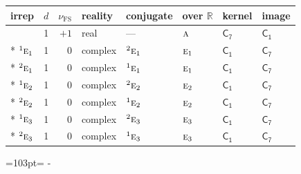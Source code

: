 \documentclass[10pt,a4paper]{article}
\newcommand{\needspace}[1]{\par\penalty-100\begingroup\dimen0=#1\relax\dimen2=\pagegoal
  \advance\dimen2-\pagetotal\ifdim\dimen0>\dimen2\relax\ifdim\dimen2>0pt\vfil\break\fi\fi
  \endgroup}
\numberwithin{equation}{section}
\newcommand{\grp}[1]{\mathsf{#1}}
\newcommand{\irr}[1]{\text{\normalfont\scshape #1}}
\newcommand{\conjpair}[1]{{}^{#1}}
\newcommand{\detbox}[1]{{\setlength{\fboxsep}{1pt}\fbox{#1}}}
\newcommand{\fsind}{\nu_{\mathrm{FS}}}
\begin{document}
{\small\renewcommand{\arraystretch}{1.25}\setlength{\tabcolsep}{4pt}\begin{longtable}{@{}lrrlllll@{}}\toprule
irrep & $d$ & $\fsind$ & reality & conjugate & over $\mathbb{R}$ & kernel & image\\\midrule\endhead
\bottomrule\endfoot\endlastfoot
\detbox{$\irr{a}$} & 1 & $+1$ & real & --- & $\irr{a}$ & \href{C7.pdf}{$\grp{C_{7}}$} & \href{C1.pdf}{$\grp{C_{1}}$}\\*
$\conjpair{1}\irr{e}_{1}$ & 1 & $0$ & complex & $\conjpair{2}\irr{e}_{1}$ & $\irr{e}_{1}$ & \href{C1.pdf}{$\grp{C_{1}}$} & \href{C7.pdf}{$\grp{C_{7}}$}\\*
$\conjpair{2}\irr{e}_{1}$ & 1 & $0$ & complex & $\conjpair{1}\irr{e}_{1}$ & $\irr{e}_{1}$ & \href{C1.pdf}{$\grp{C_{1}}$} & \href{C7.pdf}{$\grp{C_{7}}$}\\*
$\conjpair{1}\irr{e}_{2}$ & 1 & $0$ & complex & $\conjpair{2}\irr{e}_{2}$ & $\irr{e}_{2}$ & \href{C1.pdf}{$\grp{C_{1}}$} & \href{C7.pdf}{$\grp{C_{7}}$}\\*
$\conjpair{2}\irr{e}_{2}$ & 1 & $0$ & complex & $\conjpair{1}\irr{e}_{2}$ & $\irr{e}_{2}$ & \href{C1.pdf}{$\grp{C_{1}}$} & \href{C7.pdf}{$\grp{C_{7}}$}\\*
$\conjpair{1}\irr{e}_{3}$ & 1 & $0$ & complex & $\conjpair{2}\irr{e}_{3}$ & $\irr{e}_{3}$ & \href{C1.pdf}{$\grp{C_{1}}$} & \href{C7.pdf}{$\grp{C_{7}}$}\\*
$\conjpair{2}\irr{e}_{3}$ & 1 & $0$ & complex & $\conjpair{1}\irr{e}_{3}$ & $\irr{e}_{3}$ & \href{C1.pdf}{$\grp{C_{1}}$} & \href{C7.pdf}{$\grp{C_{7}}$}\\
\bottomrule\end{longtable}}
\needspace{103pt}
\end{document}
